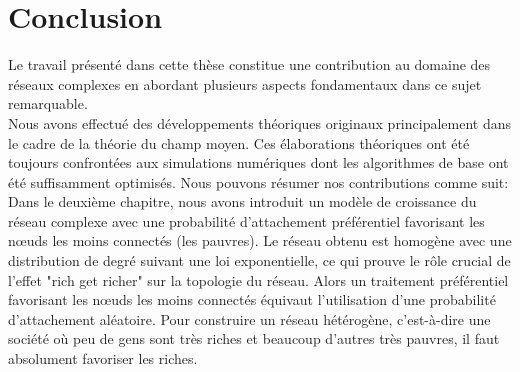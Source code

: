 
\chapter*{Conclusion}
 


Le travail présenté dans cette thèse constitue une contribution au domaine des réseaux complexes en abordant plusieurs aspects fondamentaux dans ce sujet remarquable.\\
Nous avons effectué des développements théoriques originaux principalement dans le cadre de la théorie du champ moyen. Ces élaborations théoriques ont été toujours confrontées aux simulations numériques dont les algorithmes de base ont été suffisamment optimisés. Nous pouvons résumer nos contributions comme suit: \\
Dans le deuxième chapitre, nous avons introduit un modèle de croissance du réseau complexe avec une probabilité d'attachement préférentiel favorisant les nœuds les moins connectés (les pauvres). Le réseau obtenu est homogène avec une distribution de degré suivant une loi exponentielle, ce qui prouve le rôle crucial de l'effet "rich get richer" sur la topologie du réseau. Alors un traitement préférentiel favorisant les nœuds les moins connectés équivaut l'utilisation d'une probabilité d'attachement aléatoire. Pour construire un réseau hétérogène, c'est-à-dire une société où peu de gens sont très riches et beaucoup d'autres très pauvres, il faut absolument favoriser les riches.



